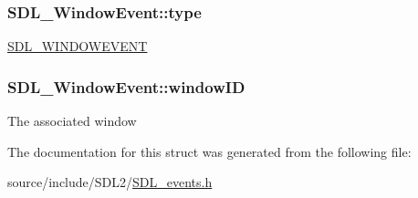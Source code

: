 \subsubsection[{type}]{ S\+D\+L\+\_\+\+Window\+Event\+::type}\label{struct_s_d_l___window_event_a01c8c8fbe8564e690f958d2db560f657}
\hyperlink{_s_d_l__events_8h_a3b589e89be6b35c02e0dd34a55f3fccaa5ff4e41f0d8b5def11cfe6a69ec0b698}{S\+D\+L\+\_\+\+W\+I\+N\+D\+O\+W\+E\+V\+E\+N\+T} \hypertarget{struct_s_d_l___window_event_a4b31796ffc84fbb7f6e9ba33e127619a}{}
\subsubsection[{window\+I\+D}]{ S\+D\+L\+\_\+\+Window\+Event\+::window\+I\+D}\label{struct_s_d_l___window_event_a4b31796ffc84fbb7f6e9ba33e127619a}
The associated window 

The documentation for this struct was generated from the following file\+:\begin{DoxyCompactItemize}
\item 
source/include/\+S\+D\+L2/\hyperlink{_s_d_l__events_8h}{S\+D\+L\+\_\+events.\+h}\end{DoxyCompactItemize}
